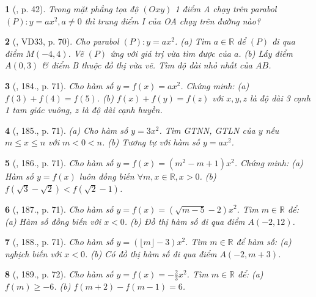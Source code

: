 \documentclass{article}
\newtheorem{baitoan}{}
\begin{document}
\begin{baitoan}[\cite{Binh_boi_duong_Toan_9_tap_2}, p. 42]
	Trong mặt phẳng tọa độ $(Oxy)$ 1 điểm A chạy trên parabol $(P):y = ax^2,a\ne0$ thì trung điểm I của OA chạy trên đường nào?
\end{baitoan}

\begin{baitoan}[\cite{Tuyen_Toan_9_old}, VD33, p. 70]
	Cho parabol $(P):y = ax^2$. (a) Tìm $a\in\mathbb{R}$ để $(P)$ đi qua điểm $M(-4,4)$. Vẽ $(P)$ ứng với giá trị vừa tìm được của $a$. (b) Lấy điểm $A(0,3)$ \& điểm B thuộc đồ thị vừa vẽ. Tìm độ dài nhỏ nhất của $AB$.
\end{baitoan}

\begin{baitoan}[\cite{Tuyen_Toan_9_old}, 184., p. 71]
	Cho hàm số $y = f(x) = ax^2$. Chứng minh: (a) $f(3) + f(4) = f(5)$. (b) $f(x) + f(y) = f(z)$ với $x,y,z$ là độ dài 3 cạnh 1 tam giác vuông, $z$ là độ dài cạnh huyền.
\end{baitoan}

\begin{baitoan}[\cite{Tuyen_Toan_9_old}, 185., p. 71]
	(a) Cho hàm số $y = 3x^2$. Tìm {\rm GTNN, GTLN} của $y$ nếu $m\le x\le n$ với $m < 0 < n$. (b) Tương tự với hàm số $y = ax^2$.
\end{baitoan}

\begin{baitoan}[\cite{Tuyen_Toan_9_old}, 186., p. 71]
	Cho hàm số $y = f(x) = (m^2 - m + 1)x^2$. Chứng minh: (a) Hàm số $y = f(x)$ luôn đồng biến $\forall m,x\in\mathbb{R},x > 0$. (b) $f(\sqrt{3} - \sqrt{2}) < f(\sqrt{2} - 1)$.
\end{baitoan}

\begin{baitoan}[\cite{Tuyen_Toan_9_old}, 187., p. 71]
	Cho hàm số $y = f(x) = (\sqrt{m - 5} - 2)x^2$. Tìm $m\in\mathbb{R}$ để: (a) Hàm số đồng biến với $x < 0$. (b) Đồ thị hàm số đi qua điểm $A(-2,12)$.
\end{baitoan}

\begin{baitoan}[\cite{Tuyen_Toan_9_old}, 188., p. 71]
	Cho hàm số $y = (\lfloor m\rfloor - 3)x^2$. Tìm $m\in\mathbb{R}$ để hàm số: (a) nghịch biến với $x < 0$. (b) Có đồ thị hàm số đi qua điểm $A(-2,m + 3)$.
\end{baitoan}

\begin{baitoan}[\cite{Tuyen_Toan_9_old}, 189., p. 72]
	Cho hàm số $y = f(x) = -\frac{2}{3}x^2$. Tìm $m\in\mathbb{R}$ để: (a) $f(m)\ge-6$. (b) $f(m + 2) - f(m - 1) = 6$.
\end{baitoan}
\end{document}
